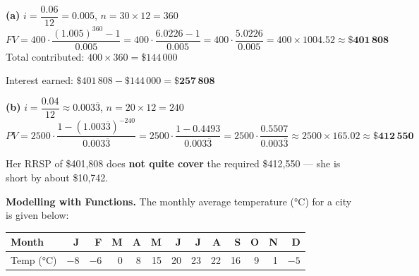\documentclass[addpoints]{exam}
\begin{document}
\begin{questions}
\begin{solution}[11cm]
\textbf{(a)} $i = \dfrac{0.06}{12} = 0.005$, $n = 30 \times 12 = 360$
\[FV = 400 \cdot \frac{(1.005)^{360}-1}{0.005} = 400 \cdot \frac{6.0226 - 1}{0.005}
= 400 \cdot \frac{5.0226}{0.005} = 400 \times 1004.52 \approx \mathbf{\$401\,808}\]
Total contributed: $400 \times 360 = \$144\,000$

Interest earned: $\$401\,808 - \$144\,000 = \mathbf{\$257\,808}$

\textbf{(b)} $i = \dfrac{0.04}{12} \approx 0.003\overline{3}$, $n = 20 \times 12 = 240$
\[PV = 2500 \cdot \frac{1-(1.003\overline{3})^{-240}}{0.003\overline{3}}
= 2500 \cdot \frac{1-0.4493}{0.003\overline{3}} = 2500 \cdot \frac{0.5507}{0.003\overline{3}}
\approx 2500 \times 165.02 \approx \mathbf{\$412\,550}\]

Her RRSP of \$401,808 does \textbf{not quite cover} the required \$412,550 — she is short by about \$10,742.
\end{solution}

\question[8] \textbf{Modelling with Functions.}
The monthly average temperature (°C) for a city is given below:

\begin{center}
\begin{tabular}{@{}lrrrrrrrrrrrr@{}}
\toprule
Month & J & F & M & A & M & J & J & A & S & O & N & D \\
\midrule
Temp (°C) & $-8$ & $-6$ & $0$ & 8 & 15 & 20 & 23 & 22 & 16 & 9 & 1 & $-5$ \\
\bottomrule
\end{tabular}
\end{center}
\end{questions}
\end{document}
